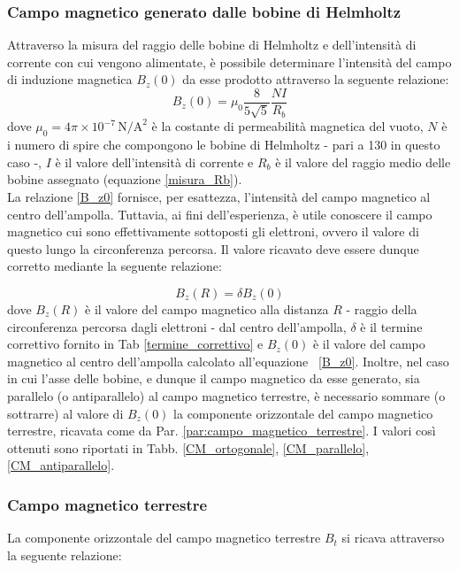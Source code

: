 \documentclass[]{article}
\begin{document}
    \subsubsection{Campo magnetico generato dalle bobine di Helmholtz}
    Attraverso la misura del raggio delle bobine di Helmholtz e dell'intensità di corrente con cui vengono alimentate, è possibile determinare l'intensità del campo di induzione magnetica $B_z(0)$ da esse prodotto attraverso la seguente relazione:
    \begin{equation}
        \label{B_z0}
        B_z (0) = \mu _0 \frac{8}{5\sqrt{5}} \frac{NI}{R_b}
    \end{equation} 
    dove $\mu _0 = 4\pi \times 10^{-7} \, \text{N/A}^2 $ è la costante di permeabilità magnetica del vuoto, $N$ è i numero di spire che compongono le bobine di Helmholtz - pari a 130 in questo caso -, $I$ è il valore dell'intensità di corrente e $R_b$ è il valore del raggio medio delle bobine assegnato (equazione \ref{misura_Rb}). \\
    La relazione \ref{B_z0} fornisce, per esattezza, l'intensità del campo magnetico al centro dell'ampolla. Tuttavia, ai fini dell'esperienza, è utile conoscere il campo magnetico cui sono effettivamente sottoposti gli elettroni, ovvero il valore di questo lungo la circonferenza percorsa. Il valore ricavato deve essere dunque corretto mediante la seguente relazione:

    \begin{equation}
        \label{B_zR}
        B_z(R) = \delta B_z(0)
    \end{equation}
    dove $B_z(R) $ è il valore del campo magnetico alla distanza $ R $ - raggio della circonferenza percorsa dagli elettroni - dal centro dell'ampolla, $\delta$ è il termine correttivo fornito in Tab \ref{termine_correttivo} e $B_z(0)$ è il valore del campo magnetico al centro dell'ampolla calcolato all'equazione ~\ref{B_z0}.
    Inoltre, nel caso in cui l'asse delle bobine, e dunque il campo magnetico da esse generato, sia parallelo (o antiparallelo) al campo magnetico terrestre, è necessario sommare (o sottrarre) al valore di $B_z(0)$ la componente orizzontale del campo magnetico terrestre, ricavata come da Par. \ref{par:campo_magnetico_terrestre}. I valori così ottenuti sono riportati in Tabb. \ref{CM_ortogonale}, \ref{CM_parallelo}, \ref{CM_antiparallelo}.

    \subsubsection{Campo magnetico terrestre}
    La componente orizzontale del campo magnetico terrestre $B_t $ si ricava attraverso la seguente relazione:
\end{document}
